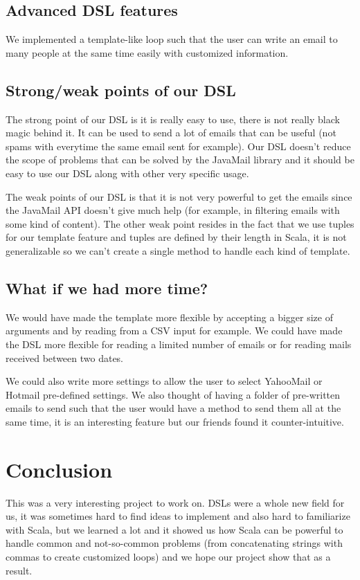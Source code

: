 \documentclass[a4paper, 11pt]{article}
\begin{document}
    \subsection{Advanced DSL features}
    We implemented a template-like loop such that the user can write an
    email to many people at the same time easily with customized information.

    
    \subsection{Strong/weak points of our DSL}
    The strong point of our DSL is it is really easy to use, there is not really
    black magic behind it. It can be used to send a lot of emails that can
    be useful (not spams with everytime the same email sent for example). Our DSL
    doesn't reduce the scope of problems that can be solved by the JavaMail
    library and it should be easy to use our DSL along with other very specific
    usage. \newline

    The weak points of our DSL is that it is not very powerful to get the emails
    since the JavaMail API doesn't give much help (for example, in filtering
    emails with some kind of content). The other weak point resides in the fact
    that we use tuples for our template feature and tuples are defined by their
    length in Scala, it is not generalizable so we can't create a single method
    to handle each kind of template.

    \subsection{What if we had more time?}

    We would have made the template more flexible by accepting a bigger size of arguments
    and by reading from a CSV input for example. We could have made the DSL
    more flexible for reading a limited number of emails or for reading mails
    received between two dates. \newline

    We could also write more settings to allow the user to select YahooMail or
    Hotmail pre-defined settings. We also thought of having a folder of pre-written
    emails to send such that the user would have a method to send them all at
    the same time, it is an interesting feature but our friends found it
    counter-intuitive.

    \section{Conclusion}

    This was a very interesting project to work on. DSLs were a whole new
    field for us, it was sometimes hard to find ideas to implement and also
    hard to familiarize with Scala, but we learned a lot and it showed us how
    Scala can be powerful to handle common and not-so-common problems (from
    concatenating strings with commas to create customized loops) and we hope
    our project show that as a result.
\end{document}
